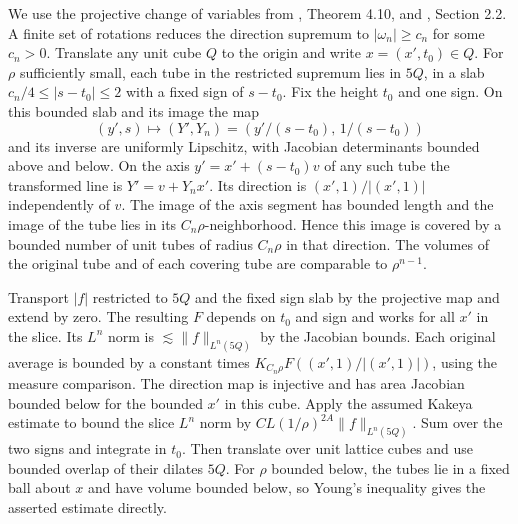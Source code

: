 We use the projective change of variables from \cite{r-75}, Theorem 4.10, and \cite{r-30}, Section 2.2. A finite set of rotations reduces the direction supremum to \(|\omega_n|\ge c_n\) for some \(c_n>0\). Translate any unit cube \(Q\) to the origin and write \(x=(x',t_0)\in Q\). For \(\rho\) sufficiently small, each tube in the restricted supremum lies in \(5Q\), in a slab \(c_n/4\le |s-t_0|\le2\) with a fixed sign of \(s-t_0\). Fix the height \(t_0\) and one sign. On this bounded slab and its image the map
\[
 (y',s)\longmapsto (Y',Y_n)=\left(y'/(s-t_0),\,1/(s-t_0)\right)
\]
and its inverse are uniformly Lipschitz, with Jacobian determinants bounded above and below. On the axis \(y'=x'+(s-t_0)v\) of any such tube the transformed line is \(Y'=v+Y_nx'\). Its direction is \((x',1)/|(x',1)|\) independently of \(v\). The image of the axis segment has bounded length and the image of the tube lies in its \(C_n\rho\)-neighborhood. Hence this image is covered by a bounded number of unit tubes of radius \(C_n\rho\) in that direction. The volumes of the original tube and of each covering tube are comparable to \(\rho^{n-1}\).

Transport \(|f|\) restricted to \(5Q\) and the fixed sign slab by the projective map and extend by zero. The resulting \(F\) depends on \(t_0\) and sign and works for all \(x'\) in the slice. Its \(L^n\) norm is \(\lesssim\|f\|_{L^n(5Q)}\) by the Jacobian bounds. Each original average is bounded by a constant times \(K_{C_n\rho}F((x',1)/|(x',1)|)\), using the measure comparison. The direction map is injective and has area Jacobian bounded below for the bounded \(x'\) in this cube. Apply the assumed Kakeya estimate to bound the slice \(L^n\) norm by \(C L(1/\rho)^{2A}\|f\|_{L^n(5Q)}\). Sum over the two signs and integrate in \(t_0\). Then translate over unit lattice cubes and use bounded overlap of their dilates \(5Q\). For \(\rho\) bounded below, the tubes lie in a fixed ball about \(x\) and have volume bounded below, so Young's inequality gives the asserted estimate directly.
